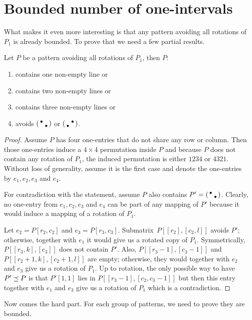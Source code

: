 \section{Bounded number of one-intervals}
What makes it even more interesting is that any pattern avoiding all rotations of $P_1$ is already bounded. To prove that we need a few partial results.
\begin{thm}
\label{boundedoneintervals}
Let $P$ be a pattern avoiding all rotations of $P_1$, then $P$:
\begin{enumerate}
	\item contains one non-empty line or
	\item contains two non-empty lines or
	\item contains three non-empty lines or
	\item avoids $\left(\begin{smallmatrix}\bullet& \\ &\bullet\end{smallmatrix}\right)$ or $\left(\begin{smallmatrix} &\bullet\\\bullet& \end{smallmatrix}\right)$.
\end{enumerate}
\end{thm}
\begin{proof}
Assume $P$ has four one-entries that do not share any row or column. Then those one-entries induce a $4\times4$ permutation inside $P$ and because $P$ does not contain any rotation of $P_1$, the induced permutation is either $1234$ or $4321$. Without loss of generality, assume it is the first case and denote the one-entries by $e_1,e_2,e_3$ and $e_4$.

For contradiction with the statement, assume $P$ also contains $P'=\left(\begin{smallmatrix}\bullet& \\ &\bullet\end{smallmatrix}\right)$. Clearly, no one-entry from $e_1,e_2,e_3$ and $e_4$ can be part of any mapping of $P'$ because it would induce a mapping of a rotation of $P_1$.

Let $e_2=P[r_2,c_2]$ and $e_3=P[r_3,c_3]$. Submatrix~$P[[r_2],[c_2,l]]$ avoids $P'$; otherwise, together with $e_1$ it would give us a rotated copy of $P_1$. Symmetrically, $P[[r_3,k],[c_3]]$ does not contain $P'$. Also, $P[[r_3-1],[c_3-1]]$ and $P[[r_2+1,k],[c_2+1,l]]$ are empty; otherwise, they would together with $e_2$ and $e_3$ give us a rotation of $P_1$. Up to rotation, the only possible way to have $P'\preceq P$ is that $P'[1,1]$ lies in $P[[r_3-1],[c_2,c_3-1]]$ but then this entry together with $e_1$ and $e_3$ give us a rotation of $P_1$ which is a contradiction.
\end{proof}

Now comes the hard part. For each group of patterns, we need to prove they are bounded.

